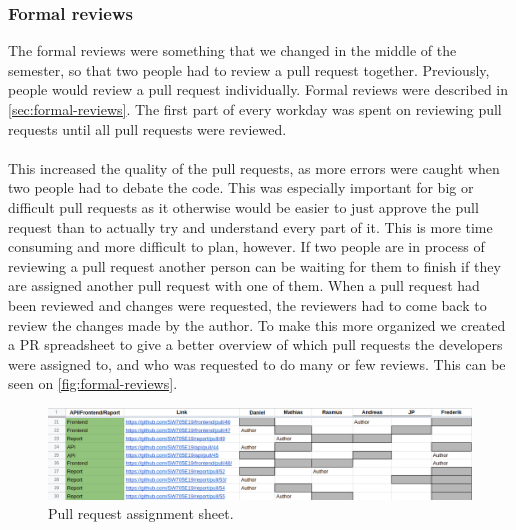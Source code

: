 \subsubsection{Formal reviews}
The formal reviews were something that we changed in the middle of the semester, so that two people had to review a pull request together.
Previously, people would review a pull request individually.
Formal reviews were described in \autoref{sec:formal-reviews}.
The first part of every workday was spent on reviewing pull requests until all pull requests were reviewed.
\\\\
This increased the quality of the pull requests, as more errors were caught when two people had to debate the code.
This was especially important for big or difficult pull requests as it otherwise would be easier to just approve the pull request than to actually try and understand every part of it.
This is more time consuming and more difficult to plan, however.
If two people are in process of reviewing a pull request another person can be waiting for them to finish if they are assigned another pull request with one of them. 
When a pull request had been reviewed and changes were requested, the reviewers had to come back to review the changes made by the author.
To make this more organized we created a PR spreadsheet to give a better overview of which pull requests the developers were assigned to, and who was requested to do many or few reviews.
This can be seen on \autoref{fig:formal-reviews}.
\begin{figure}[H]
    \centering
    \includegraphics[width=\linewidth]{figures/formal-reviews.PNG}
    \caption{Pull request assignment sheet.}
    \label{fig:formal-reviews}
\end{figure}

